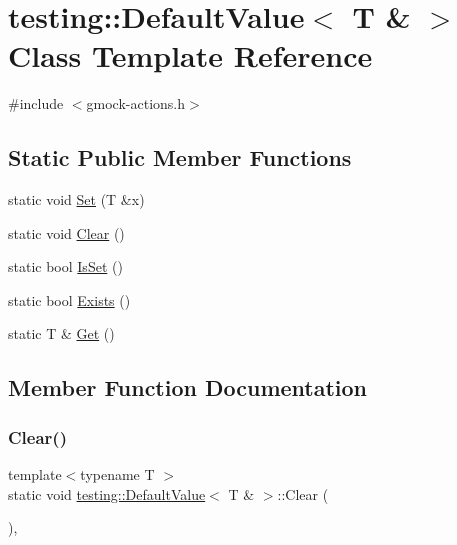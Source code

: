 \hypertarget{classtesting_1_1DefaultValue_3_01T_01_6_01_4}{}\section{testing\+::Default\+Value$<$ T \& $>$ Class Template Reference}
\label{classtesting_1_1DefaultValue_3_01T_01_6_01_4}


{\ttfamily \#include $<$gmock-\/actions.\+h$>$}

\subsection*{Static Public Member Functions}
\begin{DoxyCompactItemize}
\item 
static void \mbox{\hyperlink{classtesting_1_1DefaultValue_3_01T_01_6_01_4_a9863abf3d311ce5007d7e57dfce2f252}{Set}} (T \&x)
\item 
static void \mbox{\hyperlink{classtesting_1_1DefaultValue_3_01T_01_6_01_4_a3c8f9f81e591370f9b33798f58ca1a10}{Clear}} ()
\item 
static bool \mbox{\hyperlink{classtesting_1_1DefaultValue_3_01T_01_6_01_4_a3e61547c2f0141cc8004385f3a9c817d}{Is\+Set}} ()
\item 
static bool \mbox{\hyperlink{classtesting_1_1DefaultValue_3_01T_01_6_01_4_a38420499e17d2fb4146ae6c4265f0d55}{Exists}} ()
\item 
static T \& \mbox{\hyperlink{classtesting_1_1DefaultValue_3_01T_01_6_01_4_a1310448dd8c171aecfcbf7c8df5de7bd}{Get}} ()
\end{DoxyCompactItemize}


\subsection{Member Function Documentation}
\mbox{\label{classtesting_1_1DefaultValue_3_01T_01_6_01_4_a3c8f9f81e591370f9b33798f58ca1a10}} 
\subsubsection{\texorpdfstring{Clear()}{Clear()}}
{\footnotesize\ttfamily template$<$typename T $>$ \\
static void \mbox{\hyperlink{classtesting_1_1DefaultValue}{testing\+::\+Default\+Value}}$<$ T \& $>$\+::Clear (\begin{DoxyParamCaption}{ }\end{DoxyParamCaption})\hspace{0.3cm}{\ttfamily [inline]}, {\ttfamily [static]}}


